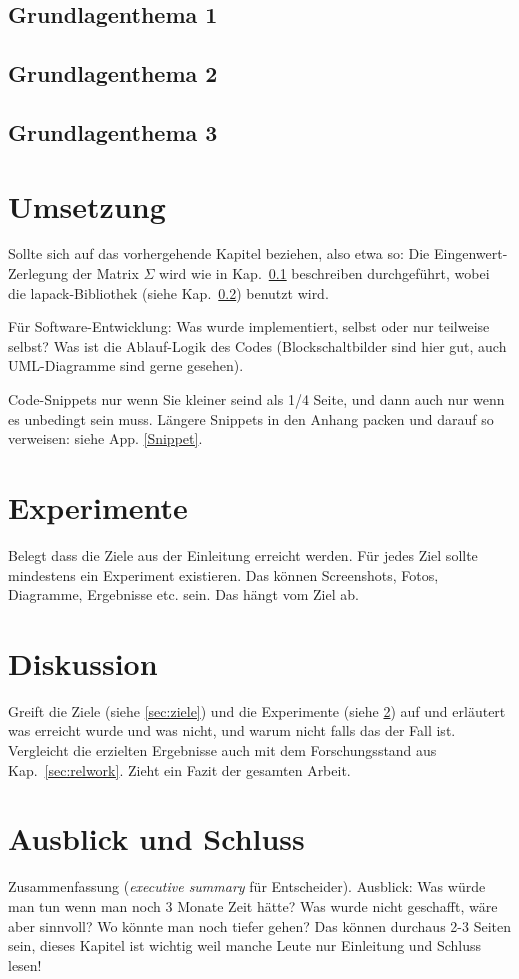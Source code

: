 \documentclass[12pt,oneside]{article}
\begin{document}
\subsection{Grundlagenthema 1}\label{sec:grundlagen1}
\subsection{Grundlagenthema 2}\label{sec:grundlagen2}
\subsection{Grundlagenthema 3}\label{sec:grundlagen3}
%
\section{Umsetzung}\label{sec:umsetzung}
Sollte sich auf das vorhergehende Kapitel beziehen, also etwa so:
Die Eingenwert-Zerlegung der Matrix $\Sigma$ wird wie in Kap.~\ref{sec:grundlagen1} beschreiben durchgeführt, wobei die lapack-Bibliothek (siehe Kap.~\ref{sec:grundlagen2}) benutzt wird.

Für Software-Entwicklung: Was wurde implementiert, selbst oder nur teilweise selbst? Was ist die Ablauf-Logik des Codes (Blockschaltbilder sind hier gut, auch UML-Diagramme sind gerne gesehen).

Code-Snippets nur wenn Sie kleiner seind als 1/4 Seite, und dann auch nur wenn es unbedingt sein muss.
Längere Snippets in den Anhang packen und darauf so verweisen: siehe App. \ref{Snippet}.

\section{Experimente}\label{sec:exp}
Belegt dass die Ziele aus der Einleitung erreicht werden. Für jedes Ziel sollte mindestens ein Experiment existieren. Das können Screenshots, Fotos, Diagramme, Ergebnisse etc. sein. Das hängt vom Ziel ab.

\section{Diskussion}
Greift die Ziele (siehe \ref{sec:ziele}) und die Experimente (siehe \ref{sec:exp}) auf und erläutert was erreicht wurde und was nicht, und warum nicht falls das der Fall ist. Vergleicht die erzielten Ergebnisse auch mit dem Forschungsstand aus Kap.~\ref{sec:relwork}. Zieht ein Fazit der gesamten Arbeit.

\section{Ausblick und Schluss}
Zusammenfassung (\textit{executive summary} für Entscheider). Ausblick: Was würde man tun wenn man noch 3 Monate Zeit hätte? Was wurde nicht geschafft, wäre aber sinnvoll? Wo könnte man noch tiefer gehen? Das können durchaus 2-3 Seiten sein, dieses Kapitel ist wichtig weil manche Leute nur Einleitung und Schluss lesen!
\end{document}
